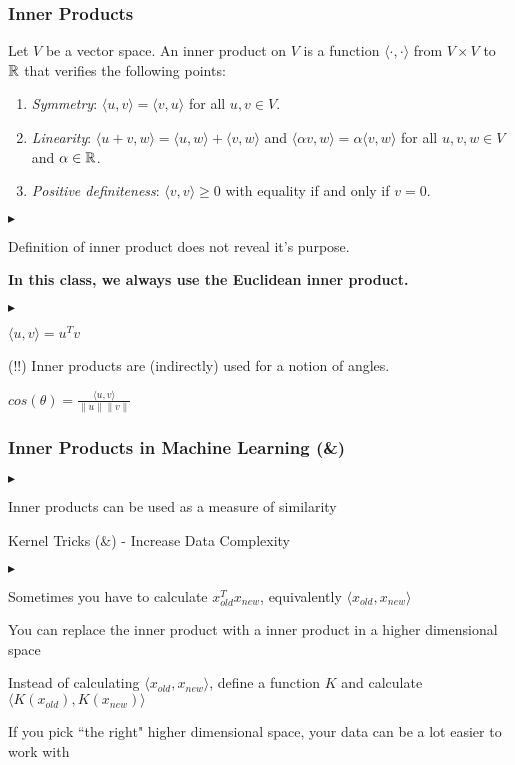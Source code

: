 \documentclass{beamer}
\renewenvironment{itemize}
\renewenvironment{enumerate}%
{\begin{list}{\arabic{enumi}.}%
      {\setlength{\leftmargin}{2.5em}%
       \setlength{\itemsep}{-\parsep}%
       \setlength{\topsep}{-\parskip}%
       \usecounter{enumi}}%
 }{\end{list}}
\renewenvironment{itemize}%
{\begin{list}{$\blacktriangleright$}%
      {\setlength{\leftmargin}{2.5em}%
       \setlength{\itemsep}{-\parsep}%
       \setlength{\topsep}{-\parskip}%
       \usecounter{enumi}}%
 }{\end{list}}
\begin{document}
\begin{frame}
\frametitle{Inner Products}
\begin{definition}
	Let $V$ be a vector space.
	An inner product on $V$ is a function $\langle \cdot, \cdot \rangle$ from $V \times V$ to $\mathbb{R}$ that verifies the following points:
	\begin{enumerate}
		\item \emph{Symmetry}: $\langle u, v \rangle = \langle v, u\rangle$ for all $u,v \in V$.
		\item \emph{Linearity}: $\langle u+v, w \rangle = \langle u, w\rangle + \langle v, w\rangle$ and $\langle \alpha v, w \rangle = \alpha \langle v, w \rangle$ for all $u,v,w \in V$ and $\alpha \in \mathbb{R}$.
		\item \emph{Positive definiteness}: $\langle v, v\rangle \geq 0$ with equality if and only if $v = 0$.
\end{enumerate}
\end{definition}
\begin{itemize}
\item Definition of inner product does not reveal it's purpose.
\item \textbf{In this class, we always use the Euclidean inner product.}
\begin{itemize}
\item $\langle u,v \rangle = u^Tv$
\end{itemize}
\item (!!) Inner products are (indirectly) used for a notion of angles.
\item $cos(\theta) = \frac{ \langle u,v \rangle }{\|u\| \|v\|}$
\end{itemize}
\end{frame}

\begin{frame}
\frametitle{Inner Products in Machine Learning (\&)}
\begin{itemize}
\item Inner products can be used as a measure of similarity
\item Kernel Tricks (\&) - Increase Data Complexity
\begin{itemize}
\item Sometimes you have to calculate  $x_{old}^T x_{new}$, equivalently $ \langle x_{old},x_{new} \rangle $
\item You can replace the inner product with a inner product in a higher dimensional space
\item Instead of calculating $ \langle x_{old},x_{new} \rangle $, define a function $K$ and calculate $ \langle K(x_{old}),K(x_{new}) \rangle $
\item If you pick ``the right" higher dimensional space, your data can be a lot easier to work with
\end{itemize}
\end{itemize}

\end{frame}
\end{document}
